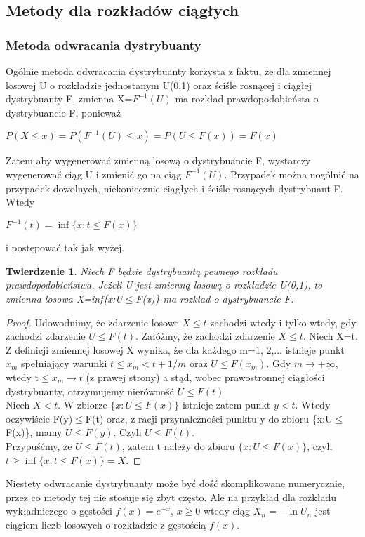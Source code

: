 \documentclass[a4paper]{scrartcl}
\newtheorem{theorem}{Twierdzenie}
\begin{document}
\subsection{Metody dla rozkładów ciągłych}
\subsubsection{Metoda odwracania dystrybuanty}
\qquad Ogólnie metoda odwracania dystrybuanty korzysta z faktu, że dla zmiennej losowej U o rozkładzie jednostanym U(0,1) oraz ściśle rosnącej i ciągłej dystrybuanty F, zmienna X=$F^{-1}(U)$ ma rozkład prawdopodobieństa o dystrybuancie F, ponieważ
\begin{center}
$P(X\leq x) = P(F^{-1}(U)\leq x)=P(U\leq F(x))=F(x)$
\end{center}
Zatem aby wygenerować zmienną losową o dystrybuancie F, wystarczy wygenerować ciąg U i zmienić go na ciąg $F^{-1}(U)$. Przypadek można uogólnić na przypadek dowolnych, niekoniecznie ciągłych i ściśle rosnących dystrybuant F. Wtedy
\begin{center}
$F^{-1}(t)=\inf\{x:t\leq F(x)\}$
\end{center}
i postępować tak jak wyżej.
\begin{theorem}
Niech F będzie dystrybuantą pewnego rozkładu prawdopodobieństwa. Jeżeli U jest zmienną losową o rozkładzie U(0,1), to zmienna losowa X=inf\{x:U$\leq$F(x)\} ma rozkład o dystrybuancie F.
\end{theorem}
\begin{proof}
Udowodnimy, że zdarzenie losowe $X\leq t$ zachodzi wtedy i tylko wtedy, gdy zachodzi zdarzenie $U\leq F(t)$.
Załóżmy, że zachodzi zdarzenie $X\leq t$.
Niech X=t. Z definicji zmiennej losowej X wynika, że dla każdego m=1, 2,... istnieje punkt $x_m$ spełniający warunki $t\leq x_m <t+1/m$ oraz $U\leq F(x_m)$. Gdy $m\to +\infty$, wtedy t$\leq x_m \to t$ (z prawej strony) a stąd, wobec prawostronnej ciągłości dystrybuanty, otrzymujemy nierówność $U\leq F(t)$\\
Niech $X<t$. W zbiorze $\{x:U\leq F(x)\}$ istnieje zatem punkt $y<t$. Wtedy oczywiście F(y)$\leq$F(t) oraz, z racji przynależności punktu y do zbioru \{x:U$\leq$F(x)\}, mamy $U\leq F(y)$. Czyli $U\leq F(t)$.\\
Przypuśćmy, że $U\leq F(t)$, zatem t należy do zbioru $\{x:U\leq F(x)\}$, czyli $t\geq\inf\{x:t\leq F(x)\}=X$.
\end{proof}
Niestety odwracanie dystrybuanty może być dość skomplikowane numerycznie, przez co metody tej nie stosuje się zbyt często. Ale na przykład dla rozkładu wykładniczego o gęstości $f(x)=e^{-x}$, $x\geq 0$ wtedy ciąg $X_n=-\ln U_n$ jest ciągiem liczb losowych o rozkładzie z gęstością $f(x)$.
\end{document}
